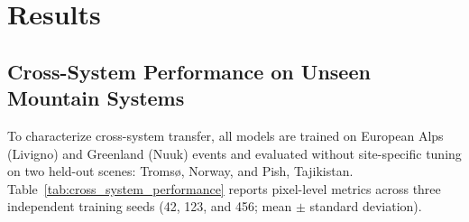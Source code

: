 \section{Results}
\label{sec:results}

\subsection{Cross-System Performance on Unseen Mountain Systems}
\label{sec:res:performance}

To characterize cross-system transfer, all models are trained on European Alps (Livigno) and Greenland (Nuuk) events and evaluated without site-specific tuning on two held-out scenes: Troms{\o}, Norway, and Pish, Tajikistan. Table~\ref{tab:cross_system_performance} reports pixel-level metrics across three independent training seeds (42, 123, and 456; mean $\pm$ standard deviation).

